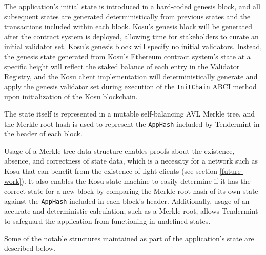 \documentclass[10pt]{article}
\begin{document}
The application's initial state is introduced in a hard-coded genesis block, and all subsequent states are generated deterministically from previous states and the transactions included within each block. Kosu’s genesis block will be generated after the contract system is deployed, allowing time for stakeholders to curate an initial validator set. Kosu’s genesis block will specify no initial validators. Instead, the genesis state generated from Kosu’s Ethereum contract system’s state at a specific height will reflect the staked balance of each entry in the Validator Registry, and the Kosu client implementation will deterministically generate and apply the genesis validator set during execution of the \texttt{InitChain} ABCI method upon initialization of the Kosu blockchain\cite{tendermint-abci-apps}.
\medskip

The state itself is represented in a mutable self-balancing AVL Merkle tree\cite{tendermint-iavl}, and the Merkle root hash is used to represent the \texttt{AppHash} included by Tendermint in the header of each block\cite{tendermint-abci-spec}.
\medskip

Usage of a Merkle tree data-structure enables proofs about the existence, absence, and correctness of state data, which is a necessity for a network such as Kosu that can benefit from the existence of light-clients (see section \ref{future-work}). It also enables the Kosu state machine to easily determine if it has the correct state for a new block by comparing the Merkle root hash of its own state against the \texttt{AppHash} included in each block’s header. Additionally, usage of an accurate and deterministic calculation, such as a Merkle root, allows Tendermint to safeguard the application from functioning in undefined states\cite{tendermint-abci-apps}. 
\medskip

Some of the notable structures maintained as part of the application's state are described below.
\end{document}
